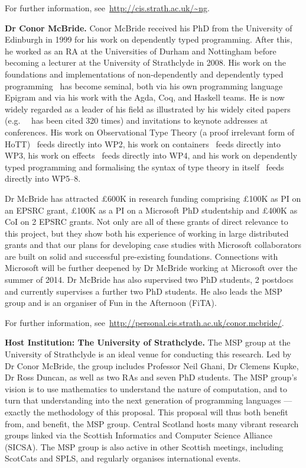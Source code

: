 \documentclass[a4paper,11pt]{article}
\newcommand{\eg}{{e.g.}\ }
\begin{document}
For further information, see~\url{http://cis.strath.ac.uk/~ng}.

\textbf{Dr Conor McBride.} Conor McBride received his PhD from the
University of Edinburgh in 1999 for his work on dependently typed
programming. After this, he worked as an RA at the Universities of
Durham and Nottingham before becoming a lecturer at the University of
Strathclyde in 2008. His work on the foundations and implementations
of non-dependently and dependently typed
programming~\cite{viewftl,alti:ott-conf,easy,mcbride:outrageous} has
become seminal, both via his own programming language Epigram and via
his work with the Agda, Coq, and Haskell teams. He is now widely
regarded as a leader of his field as illustrated by his widely cited
papers (\eg ~\cite{viewftl} has been cited 320 times) and invitations
to keynote addresses at conferences. His work on Observational Type
Theory (a proof irrelevant form of HoTT)~\cite{alti:ott-conf} feeds directly
into WP2, his work on containers~\cite{alti:mpc04} feeds directly into WP3, his
work on effects~\cite{conor:frank} feeds directly into WP4, and his work on
dependently typed programming and formalising the syntax of type
theory in itself~\cite{viewftl,alti:ott-conf,easy,mcbride:outrageous}
feeds directly into WP5--8.

Dr McBride has attracted \pounds 600K in research funding comprising
\pounds 100K as PI on an EPSRC grant, \pounds 100K as a PI on a
Microsoft PhD studentship and \pounds 400K as CoI on 2 EPSRC
grants. Not only are all of these grants of direct relevance to this
project, but they show both his experience of working in large
distributed grants and that our plans for developing case studies with
Microsoft collaborators are built on solid and successful pre-existing
foundations. Connections with Microsoft will be further deepened by Dr
McBride working at Microsoft over the summer of 2014.  Dr McBride has
also supervised two PhD students, 2 postdocs and currently supervises
a further two PhD students. He also leads the MSP group and is an
organiser of Fun in the Afternoon (FiTA).

For further information,
see~\url{http://personal.cis.strath.ac.uk/conor.mcbride/}.

\textbf{Host Institution: The University of Strathclyde.} The MSP
group at the University of Strathclyde is an ideal venue for
conducting this research. Led by Dr Conor McBride, the group includes
Professor Neil Ghani, Dr Clemens Kupke, Dr Ross Duncan, as well as two
RAs and seven PhD students. The MSP group's vision is to use
mathematics to understand the nature of computation, and to turn that
understanding into the next generation of programming languages ---
exactly the methodology of this proposal. This proposal will thus both
benefit from, and benefit, the MSP group. Central Scotland hosts many vibrant
research groups linked via the Scottish Informatics and Computer
Science Alliance (SICSA). The MSP group is also active in other
Scottish meetings, including ScotCats and SPLS, and regularly
organises international events.
\end{document}
